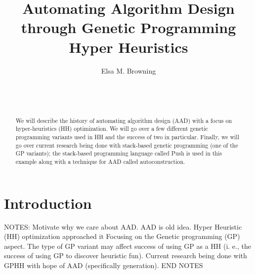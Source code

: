 \documentclass{sig-alternate}
\begin{document}

\title{Automating Algorithm Design through Genetic Programming Hyper Heuristics}


\author{
\alignauthor
Elsa M. Browning\\
	\\
	\\
	\\
}

\maketitle
\begin{abstract}
	 We will describe the history of automating algorithm design (AAD) with a focus on hyper-heuristics (HH) optimization. We will go over a few different genetic programming variants used in HH and the success of two in particular. Finally, we will go over current research being done with stack-based genetic programming (one of the GP variants); the stack-based programming language called Push is used in this example along with a technique for AAD called autoconstruction.
	
\end{abstract}


\section{Introduction}
\label{sec:introduction}
NOTES:
Motivate why we care about AAD.
AAD is old idea.
Hyper Heuristic (HH) optimization approached it
Focusing on the Genetic programming (GP) aspect.
The type of GP variant may affect success of using GP as a HH (i. e., the success of using GP to discover heuristic fun).
Current research being done with GPHH with hope of AAD (specifically generation).
END NOTES
\end{document}
